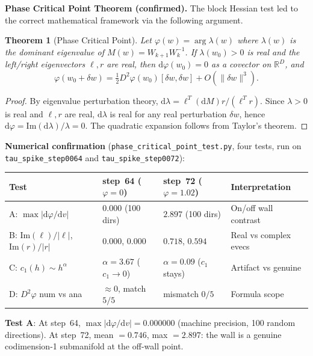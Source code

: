 \documentclass[11pt]{amsart}
\newtheorem{theorem}{Theorem}[section]
\begin{document}
\textbf{Phase Critical Point Theorem (confirmed).}
The block Hessian test led to the correct mathematical framework
via the following argument.

\begin{theorem}[Phase Critical Point]
\label{thm:phase_critical}
Let $\varphi(w) = \arg\lambda(w)$ where $\lambda(w)$ is the dominant
eigenvalue of $M(w) = W_{k+1}W_k^{-1}$.
If $\lambda(w_0) > 0$ is real and the left/right eigenvectors
$\ell, r$ are real, then $\mathrm{d}\varphi(w_0) = 0$ as a covector
on $\mathbb{R}^D$, and
\[
  \varphi(w_0 + \delta w) = \tfrac{1}{2}D^2\varphi(w_0)[\delta w,\delta w]
  + O(\|\delta w\|^3).
\]
\end{theorem}

\begin{proof}
By eigenvalue perturbation theory, $\mathrm{d}\lambda = \ell^T(\mathrm{d}M)r / (\ell^T r)$.
Since $\lambda > 0$ is real and $\ell, r$ are real, $\mathrm{d}\lambda$
is real for any real perturbation $\delta w$, hence
$\mathrm{d}\varphi = \mathrm{Im}(\mathrm{d}\lambda)/\lambda = 0$.
The quadratic expansion follows from Taylor's theorem.
\end{proof}

\textbf{Numerical confirmation} (\texttt{phase\_critical\_point\_test.py},
four tests, run on \texttt{tau\_spike\_step0064} and \texttt{tau\_spike\_step0072}):

\begin{center}
\small
\begin{tabular}{@{}llll@{}}
\toprule
Test & step~64 ($\varphi=0$) & step~72 ($\varphi=1.02$) & Interpretation \\
\midrule
A: $\max|\mathrm{d}\varphi/\mathrm{d}v|$
  & $0.000$ (100 dirs) & $2.897$ (100 dirs) & On/off wall contrast \\
B: $\mathrm{Im}(\ell)/|\ell|$, $\mathrm{Im}(r)/|r|$
  & $0.000$, $0.000$ & $0.718$, $0.594$ & Real vs complex evecs \\
C: $c_1(h) \sim h^\alpha$
  & $\alpha=3.67$ ($c_1\to0$) & $\alpha=0.09$ ($c_1$ stays) & Artifact vs genuine \\
D: $D^2\varphi$ num vs ana
  & $\approx0$, match $5/5$ & mismatch $0/5$ & Formula scope \\
\bottomrule
\end{tabular}
\end{center}

\textbf{Test A}: At step~64, $\max|\mathrm{d}\varphi/\mathrm{d}v| = 0.000000$
(machine precision, 100 random directions).
At step~72, mean $= 0.746$, max $= 2.897$: the wall is a genuine
codimension-1 submanifold at the off-wall point.
\end{document}

